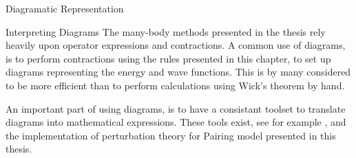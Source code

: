 \documentclass[twoside,english]{uiofysmaster}
\begin{document}
\begin{chapter}{Diagramatic Representation}
	\begin{section}{Interpreting Diagrams}	
		The many-body methods presented in the thesis rely heavily upon operator expressions and contractions. A common use of diagrams, is to perform  contractions using the rules presented in this chapter, to set up diagrams representing the energy and wave functions. This is by many considered to be more efficient than to perform calculations using Wick's theorem by hand. 

		An important part of using diagrams, is to have a consistant toolset to translate diagrams into mathematical expressions. These tools exist, see for example \cite{ShavittAndBartlett}, and the implementation of perturbation theory for Pairing model presented in this thesis.  
	\end{section}

\end{chapter}
\end{document}
